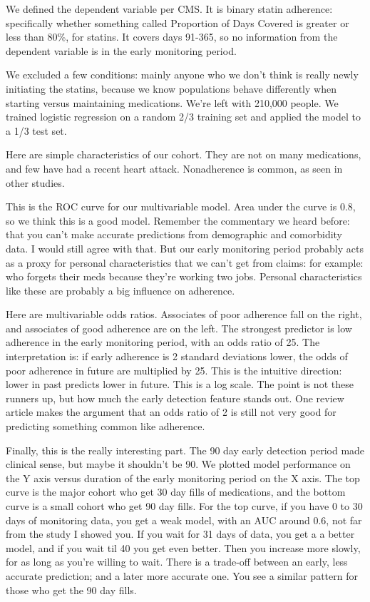 \documentclass[12pt]{report}
\begin{document}
\begin{large}
We defined the dependent variable per CMS. It is binary statin
adherence: specifically whether something called Proportion of Days
Covered is greater or less than 80\%, for statins. It covers days
91-365, so no information from the dependent variable is in the early
monitoring period.

We excluded a few conditions: mainly anyone who we don't think is
really newly initiating the statins, because we know populations
behave differently when starting versus maintaining medications. We're
left with 210,000 people. We trained logistic regression on a random
2/3 training set and applied the model to a 1/3 test set. %

Here are simple characteristics of our cohort. They are not on many
medications, and few have had a recent heart attack. Nonadherence is
common, as seen in other studies. %

This is the ROC curve for our multivariable model. Area under the
curve is 0.8, so we think this is a good model. Remember the
commentary we heard before: that you can't make accurate predictions
from demographic and comorbidity data. I would still agree with that.
But our early monitoring period probably acts as a proxy for personal
characteristics that we can't get from claims: for example: who
forgets their meds because they're working two jobs. Personal
characteristics like these are probably a big influence on adherence. %

Here are multivariable odds ratios. Associates of poor adherence fall
on the right, and associates of good adherence are on the left. The
strongest predictor is low adherence in the early monitoring period,
with an odds ratio of 25. The interpretation is: if early adherence is
2 standard deviations lower, the odds of poor adherence in future are
multiplied by 25. This is the intuitive direction: lower in past
predicts lower in future. This is a log scale. The point is not these
runners up, but how much the early detection feature stands out. One
review article makes the argument that an odds ratio of 2 is still not
very good for predicting something common like adherence. %

Finally, this is the really interesting part. The 90 day early
detection period made clinical sense, but maybe it shouldn't be 90. We
plotted model performance on the Y axis versus duration of the early
monitoring period on the X axis. The top curve is the major cohort who
get 30 day fills of medications, and the bottom curve is a small
cohort who get 90 day fills. For the top curve, if you have 0 to 30
days of monitoring data, you get a weak model, with an AUC around 0.6,
not far from the study I showed you. If you wait for 31 days of data,
you get a a better model, and if you wait til 40 you get even better.
Then you increase more slowly, for as long as you're willing to wait.
There is a trade-off between an early, less accurate prediction; and a
later more accurate one. You see a similar pattern for those who get
the 90 day fills. %


\end{large}
\end{document}
